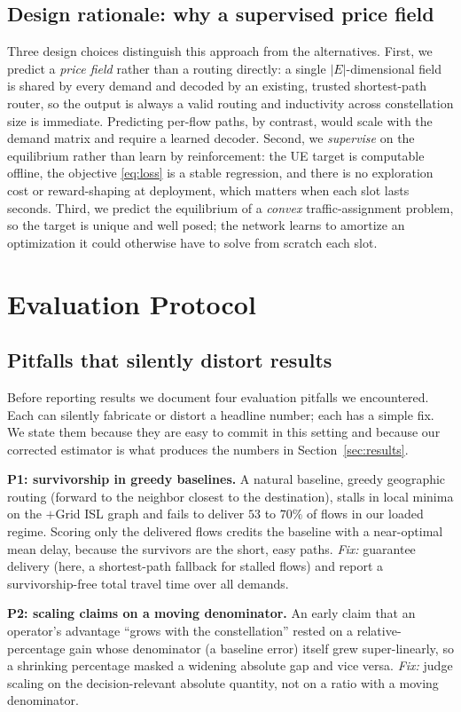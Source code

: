\documentclass[journal]{IEEEtran}
\begin{document}
\subsection{Design rationale: why a supervised price field}
Three design choices distinguish this approach from the alternatives. First, we predict
a \emph{price field} rather than a routing directly: a single $|E|$-dimensional field is
shared by every demand and decoded by an existing, trusted shortest-path router, so the
output is always a valid routing and inductivity across constellation size is immediate.
Predicting per-flow paths, by contrast, would scale with the demand matrix and require a
learned decoder. Second, we \emph{supervise} on the equilibrium rather than learn by
reinforcement: the UE target is computable offline, the objective \eqref{eq:loss} is a
stable regression, and there is no exploration cost or reward-shaping at deployment,
which matters when each slot lasts seconds. Third, we predict the equilibrium of a
\emph{convex} traffic-assignment problem, so the target is unique and well posed; the
network learns to amortize an optimization it could otherwise have to solve from scratch
each slot.

\section{Evaluation Protocol}\label{sec:pitfalls}
\subsection{Pitfalls that silently distort results}
Before reporting results we document four evaluation pitfalls we encountered. Each can
silently fabricate or distort a headline number; each has a simple fix. We state them
because they are easy to commit in this setting and because our corrected estimator is
what produces the numbers in Section~\ref{sec:results}.

\textbf{P1: survivorship in greedy baselines.} A natural baseline, greedy geographic
routing (forward to the neighbor closest to the destination), stalls in local minima on
the $+$Grid ISL graph and fails to deliver $53$ to $70\%$ of flows in our loaded
regime. Scoring only the delivered flows credits the baseline with a near-optimal mean
delay, because the survivors are the short, easy paths. \emph{Fix:} guarantee delivery
(here, a shortest-path fallback for stalled flows) and report a survivorship-free total
travel time over all demands.

\textbf{P2: scaling claims on a moving denominator.} An early claim that an operator's
advantage ``grows with the constellation'' rested on a relative-percentage gain whose
denominator (a baseline error) itself grew super-linearly, so a shrinking percentage
masked a widening absolute gap and vice versa. \emph{Fix:} judge scaling on the
decision-relevant absolute quantity, not on a ratio with a moving denominator.
\end{document}
